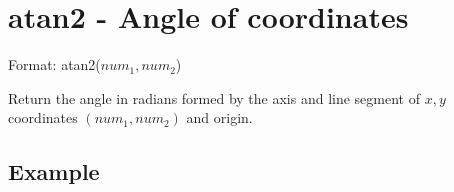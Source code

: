 
%

\section{atan2 - Angle of coordinates\label{sect:atan2}}

Format: atan2($num_1,num_2$)

Return the angle in radians formed by the axis and line segment of $x,y$ coordinates $(num_1,num_2)$ and origin. 


\subsection*{Example}


%

